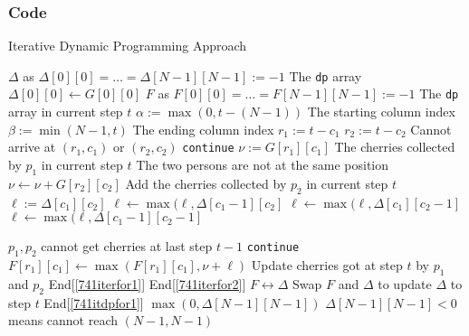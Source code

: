 \documentclass[a4paper,12pt]{article}
\begin{document}
\subsubsection{Code}
\begin{algorithm}[H]
\caption{Iterative Dynamic Programming Approach}
\begin{algorithmic}[1]
\State $\Delta$ as $\Delta[0][0] =\ldots = \Delta[N-1][N-1]:=-1$ \Comment The \texttt{dp} array
\State $\Delta[0][0]\gets G[0][0]$
 \label{741itdpfor1}
\State $F$ as $F[0][0] = \ldots = F[N-1][N-1] := -1$ \Comment The \texttt{dp} array in current step $t$
\State $\alpha:=\max(0, t-(N-1))$ \Comment The starting column index
\State $\beta:=\min(N-1, t)$ \Comment The ending column index
 \label{741iterfor1}
 \label{741iterfor2}
\State $r_1:=t-c_1$
\State $r_2:=t-c_2$
 \Comment Cannot arrive at $(r_1, c_1)$ or $(r_2,c_2)$ \State \texttt{continue}
\EndIf
\State $\nu:=G[r_1][c_1]$ \Comment The cherries collected by $p_1$ in current step $t$
 \Comment The two persons are not at the same position
\State $\nu \gets \nu + G[r_2][c_2]$ \Comment Add the cherries collected by $p_2$ in current step $t$
\EndIf
\State $\ell:=\Delta[c_1][c_2]$ \label{741itexplain_start}
\State $\ell\gets \max(\ell, \Delta[c_1-1][c_2]$
\EndIf
{}
\State $\ell\gets \max(\ell, \Delta[c_1][c_2-1]$
\EndIf
{}
\State $\ell\gets \max(\ell, \Delta[c_1-1][c_2-1]$
\EndIf \label{741itexplain_end}
\end{algorithmic}
\end{algorithm}
\begin{algorithm} [H]
\begin{algorithmic}[1]
 \Comment $p_1, p_2$ cannot get cherries at last step $t-1$
\State \texttt{continue}
\EndIf
\State $F[r_1][c_1] \gets \max(F[r_1][c_1], \nu + \ell)$ \Comment Update cherries got at step $t$ by $p_1$ and $p_2$
\EndFor \Comment End[\ref{741iterfor1}]
\EndFor \Comment End[\ref{741iterfor2}]
\State $F\leftrightarrow \Delta$ \Comment Swap $F$ and $\Delta$ to update $\Delta$ to step $t$
\EndFor \Comment End[\ref{741itdpfor1}]
\State \Return $\max(0, \Delta[N-1][N-1])$ \Comment $\Delta[N-1][N-1]<0$ means cannot reach $(N-1, N-1)$
\EndProcedure
\end{algorithmic}
\end{algorithm}
\end{document}
